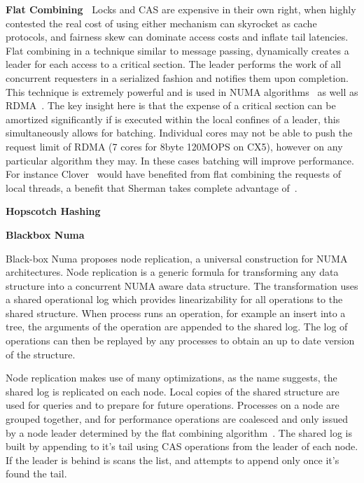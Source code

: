 \textbf{Flat Combining~\cite{flat-combine}} Locks and CAS are expensive in their
own right, when highly contested the real cost of using either mechanism can
skyrocket as cache protocols, and fairness skew can dominate access costs and
inflate tail latencies. Flat combining in a technique similar to message
passing, dynamically creates a leader for each access to a critical section. The
leader performs the work of all concurrent requesters in a serialized fashion
and notifies them upon completion. This technique is extremely powerful and is
used in NUMA algorithms~\cite{black-box-numa} as well as RDMA~\cite{flock}. The
key insight here is that the expense of a critical section can be amortized
significantly if is executed within the local confines of a leader, this
simultaneously allows for batching. Individual cores may not be able to push the
request limit of RDMA (7 cores for 8byte 120MOPS on CX5), however on
any particular algorithm they may. In these cases batching will improve
performance. For instance Clover~\cite{clover} would have benefited from flat
combining the requests of local threads, a benefit that Sherman takes complete
advantage of~\cite{sherman}.


\textbf{Hopscotch Hashing~\cite{hopscotch}}

\textbf{Blackbox Numa~\cite{black-box-numa}}

Black-box Numa proposes node replication, a universal construction for NUMA
architectures. Node replication is a generic formula for transforming any data
structure into a concurrent NUMA aware data structure. The transformation uses a
shared operational log which provides linearizability for all operations to the
shared structure. When process runs an operation, for example an insert into a
tree, the arguments of the operation are appended to the shared log. The log of
operations can then be replayed by any processes to obtain an up to date version
of the structure.

Node replication makes use of many optimizations, as the name suggests, the
shared log is replicated on each node. Local copies of the shared structure are
used for queries and to prepare for future operations. Processes on a node are
grouped together, and for performance operations are coalesced and only issued
by a node leader determined by the flat combining algorithm~\cite{flat-combine}.
The shared log is built by appending to it's tail using CAS operations from the
leader of each node. If the leader is behind is scans the list, and attempts to
append only once it's found the tail.

